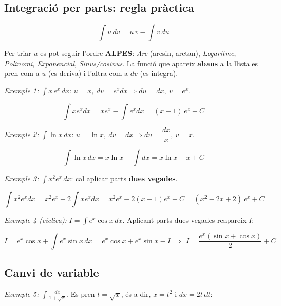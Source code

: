 \subsection{Integració per parts: regla pràctica}

\begin{equation*}
\int u\,dv = u\,v - \int v\,du
\end{equation*}

Per triar $u$ es pot seguir l'ordre \textbf{ALPES}: \emph{Arc} (arcsin, arctan), \emph{Logaritme}, \emph{Polinomi}, \emph{Exponencial}, \emph{Sinus/cosinus}. La funció que apareix \textbf{abans} a la llista es pren com a $u$ (es deriva) i l'altra com a $dv$ (es integra).

\emph{Exemple 1:} $\displaystyle\int x\,e^x\,dx$: $u=x,\ dv=e^xdx \Rightarrow du=dx,\ v=e^x$.

\begin{equation*}
\int x e^x dx = x e^x - \int e^x dx = (x-1)\,e^x + C
\end{equation*}

\emph{Exemple 2:} $\displaystyle\int \ln x\,dx$: $u=\ln x,\ dv=dx \Rightarrow du=\dfrac{dx}{x},\ v=x$.

\begin{equation*}
\int \ln x\,dx = x\ln x - \int dx = x\ln x - x + C
\end{equation*}

\emph{Exemple 3:} $\displaystyle\int x^2 e^x\,dx$: cal aplicar parts \textbf{dues vegades}.

\begin{equation*}
\int x^2e^xdx = x^2e^x - 2\int xe^xdx = x^2e^x - 2(x-1)e^x + C = (x^2-2x+2)\,e^x + C
\end{equation*}

\emph{Exemple 4 (cíclica):} $I=\displaystyle\int e^x\cos x\,dx$. Aplicant parts dues vegades reapareix $I$:

\begin{equation*}
I = e^x\cos x + \int e^x\sin x\,dx = e^x\cos x + e^x\sin x - I \;\Rightarrow\; I=\frac{e^x(\sin x+\cos x)}{2}+C
\end{equation*}

\subsection{Canvi de variable}

\emph{Exemple 5:} $\displaystyle\int\frac{dx}{1+\sqrt x}$. Es pren $t=\sqrt x$, és a dir, $x=t^2$ i $dx=2t\,dt$:

